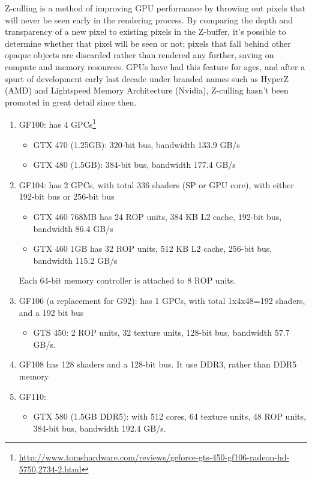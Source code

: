 \begin{framed}
 Z-culling is a method of improving GPU performance by throwing out pixels that
will never be seen early in the rendering process. By comparing the depth and
transparency of a new pixel to existing pixels in the Z-buffer, it's possible to
determine whether that pixel will be seen or not; pixels that fall behind other
opaque objects are discarded rather than rendered any further, saving on compute
and memory resources. GPUs have had this feature for ages, and after a spurt of
development early last decade under branded names such as HyperZ (AMD) and
Lightspeed Memory Architecture (Nvidia), Z-culling hasn't been promoted in great
detail since then. 
\end{framed}
\begin{enumerate}
  \item GF100: has 4
  GPCs\footnote{\url{http://www.tomshardware.com/reviews/geforce-gts-450-gf106-radeon-hd-5750,2734-2.html}}
  \begin{itemize}
    \item GTX 470 (1.25GB): 320-bit bus, bandwidth 133.9 GB/s
    \item GTX 480 (1.5GB): 384-bit bus, bandwidth 177.4 GB/s
  \end{itemize}
  \item GF104: has 2 GPCs, with total 336 shaders (SP or GPU core), with either
  192-bit bus or 256-bit bus
  \begin{itemize}
    \item GTX 460 768MB has 24 ROP units, 384 KB L2 cache, 192-bit bus,
    bandwidth 86.4 GB/s
    \item GTX 460 1GB has 32 ROP units, 512 KB L2 cache, 256-bit bus, bandwidth
    115.2 GB/s
  \end{itemize}
  Each  64-bit memory controller is attached to 8 ROP units.
  \item GF106 (a replacement for G92): has 1 GPCs, with total 1x4x48=192
  shaders, and a 192 bit bus
  \begin{itemize}
    \item GTS 450: 2 ROP units, 32 texture units, 128-bit bus, bandwidth 57.7
    GB/s.
  \end{itemize}
  \item GF108 has 128 shaders and a 128-bit bus. It use DDR3, rather than DDR5
  memory
  \item GF110:
  \begin{itemize}
    \item GTX 580 (1.5GB DDR5): with 512 cores, 64 texture units, 48 ROP units,
    384-bit bus, bandwidth 192.4 GB/s. 
  \end{itemize}
\end{enumerate}


